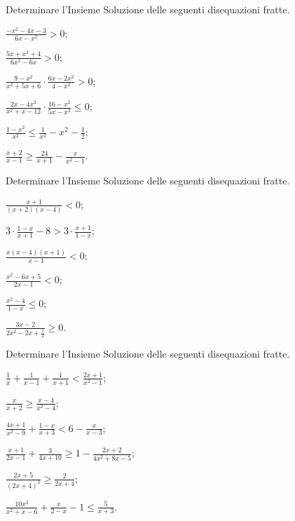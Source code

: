 \begin{esercizio}[\Ast]
 \label{ese:4.58}
Determinare l'Insieme Soluzione delle seguenti disequazioni fratte.
\begin{multicols}{2}
\begin{enumeratea}
\item $\frac{-x^2-4x-3}{6x-x^2}>0$;
\item $\frac{5x+x^2+4}{6x^2-6x}>0$;
\item $\frac{9-x^2}{x^2+5x+6}\cdot \frac{6x-2x^2}{4-x^2}>0$;
\item $\frac{2x-4x^2}{x^2+x-12}\cdot \frac{16-x^2}{5x-x^2}\le 0$;
\item $\frac{1-x^2}{x^2}\le \frac 1{x^2}-x^2-\frac 1 2$;
\item $\frac{x+2}{x-1}\ge \frac{24}{x+1}-\frac x{x^2-1}$.
\end{enumeratea}
\end{multicols}
\end{esercizio}
 
\begin{esercizio}[\Ast]
 \label{ese:4.59}
Determinare l'Insieme Soluzione delle seguenti disequazioni fratte.
\begin{multicols}{2}
\begin{enumeratea}
\item $\frac{x+1}{(x+2)(x-4)}<0$;
\item $3\cdot\frac{1-x}{x+1}-8>3\cdot\frac{x+1}{1-x}$;
\item $\frac{x(x-4)(x+1)}{x-1}<0$;
\item $\frac{x^2-6x+5}{2x-1}<0$;
\item $\frac{x^2-4}{1-x}\le 0$;
\item $\frac{3x-2}{2x^2-2x+\frac{1}{2}}\ge 0$.
\end{enumeratea}
\end{multicols}
\end{esercizio}

\begin{esercizio}[\Ast]
 \label{ese:4.60}
Determinare l'Insieme Soluzione delle seguenti disequazioni fratte.
\begin{multicols}{2}
\begin{enumeratea}
\item $\frac 1 x+\frac 1{x-1}+\frac 1{x+1}<\frac{2x+1}{x^2-1}$;
\item $\frac x{x+2}\ge \frac{x-4}{x^2-4}$;
\item $\frac{4x+1}{x^2-9}+\frac{1-x}{x+3}<6-\frac x{x-3}$;
\item $\frac{x+1}{2x-1}+\frac 3{4x+10}\ge 1-\frac{2x+2}{4x^2+8x-5}$;
\item $\frac{2x+5}{(2x+4)^2}\ge \frac 2{2x+4}$;
\item $\frac{10x^2}{x^2+x-6}+\frac x{2-x}-1\le \frac 5{x+3}$.
\end{enumeratea}
\end{multicols}
\end{esercizio}

